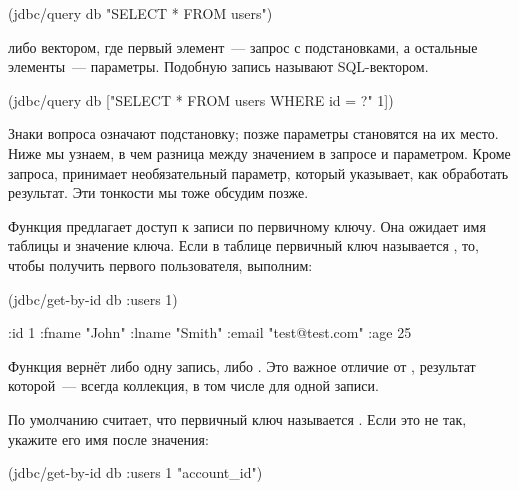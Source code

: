 \begin{english}
  \begin{clojure}
(jdbc/query db "SELECT * FROM users")
  \end{clojure}
\end{english}

\noindent
либо вектором, где первый элемент~--- запрос с подстановками, а остальные элементы~--- параметры. Подобную запись называют SQL-вектором.

\begin{english}
  \begin{clojure}
(jdbc/query db
            ["SELECT * FROM users WHERE id = ?" 1])
  \end{clojure}
\end{english}

Знаки вопроса означают подстановку; позже параметры становятся на их место. Ниже мы узнаем, в чем разница между значением в запросе и параметром. Кроме запроса,  принимает необязательный параметр, который указывает, как обработать результат. Эти тонкости мы тоже обсудим позже.

Функция  предлагает доступ к записи по первичному ключу. Она ожидает имя таблицы и значение ключа. Если в таблице  первичный ключ называется , то, чтобы получить первого пользователя, выполним:

\begin{english}
  \begin{clojure}
(jdbc/get-by-id db :users 1)

{:id 1
 :fname "John"
 :lname "Smith"
 :email "test@test.com"
 :age 25}
  \end{clojure}
\end{english}

Функция вернёт либо одну запись, либо . Это важное отличие от , результат которой~--- всегда коллекция, в том числе для одной записи.


По умолчанию  считает, что первичный ключ называется . Если это не так, укажите  его имя после значения:

\begin{english}
  \begin{clojure}
(jdbc/get-by-id db :users 1 "account_id")
  \end{clojure}
\end{english}


